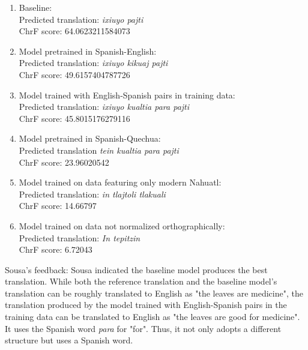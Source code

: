 \documentclass[10pt,twocolumn]{article}
\begin{document}
\begin{enumerate}
    \item Baseline: \\
    Predicted translation: \textit{ixiuyo pajti} \\ ChrF score: 64.0623211584073
    \item Model pretrained in Spanish-English: \\
    Predicted translation: \textit{ixiuyo kikuaj pajti} \\ ChrF score: 49.6157404787726
    \item Model trained with  English-Spanish pairs in training data: \\
    Predicted translation: \textit{ixiuyo kualtia para pajti} \\ ChrF score: 45.8015176279116
    \item Model pretrained in Spanish-Quechua: \\
    Predicted translation \textit{tein kualtia para pajti} \\ ChrF score: 23.96020542
    \item Model trained on data featuring only modern Nahuatl: \\ 
    Predicted translation: \textit{in tlajtoli tlakuali} \\ ChrF score: 14.66797
    \item Model trained on data not normalized orthographically: \\ 
    Predicted translation: \textit{In tepitzin} \\ ChrF score: 6.72043
    
\end{enumerate}

Sousa's feedback:
Sousa indicated the baseline model produces the best translation. While both the reference translation and the baseline model's translation can be roughly translated to English as "the leaves are medicine", the translation produced by the model trained with English-Spanish pairs in the training data can be translated to English as "the leaves are good for medicine". It uses the Spanish word \textit{para} for "for". Thus, it not only adopts a different structure but uses a Spanish word. 
\end{document}
